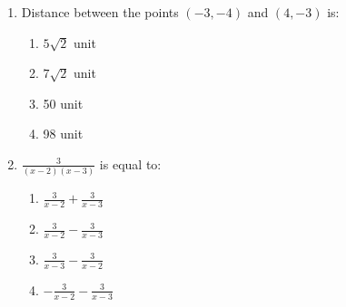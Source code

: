 \documentclass[12pt]{article}
\begin{document}
\begin{enumerate}
    \item Distance between the points $(-3, -4)$ and $(4, -3)$ is:
    \begin{enumerate}
        \item $5\sqrt{2}$ unit
        \item $7\sqrt{2}$ unit
        \item 50 unit
        \item 98 unit
    \end{enumerate}

    \item $\frac{3}{(x-2)(x-3)}$ is equal to:
    \begin{enumerate}
        \item $\frac{3}{x-2} + \frac{3}{x-3}$
        \item $\frac{3}{x-2} - \frac{3}{x-3}$
        \item $\frac{3}{x-3} - \frac{3}{x-2}$
        \item $-\frac{3}{x-2} - \frac{3}{x-3}$
    \end{enumerate}
\end{enumerate}
\end{document}
